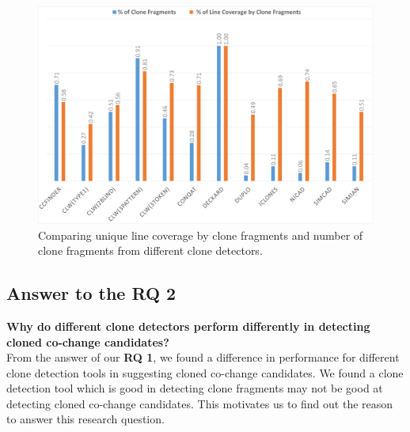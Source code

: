 \documentclass[review]{elsarticle}
\begin{document}
\vspace{2mm}
\begin{figure}
\centering
\includegraphics[width=\textwidth] {AverageLineCoveredPerSS.png}
\caption{Comparing unique line coverage by clone fragments and number of clone fragments from different clone detectors.}
\label{fig:AverageLineCoveredPerSS}
\end{figure}
\subsection{Answer to the \textbf{RQ 2}}
\textbf{Why do different clone detectors perform differently in detecting cloned co-change candidates?} \\

From the answer of our \textbf{RQ 1}, we found a difference in performance for different clone detection tools in suggesting cloned co-change candidates. We found a clone detection tool which is good in detecting clone fragments may not be good at detecting cloned co-change candidates. This motivates us to find out the reason to answer this research question. 
\end{document}
